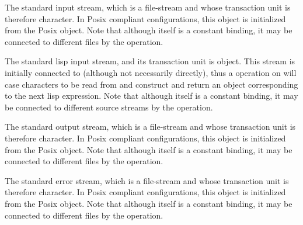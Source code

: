 \begin{optDefinition}

\remarks%
The standard input stream, which is a file-stream and whose transaction unit is
therefore character. In Posix compliant configurations, this object is
initialized from the Posix  object. Note that although
 itself is a constant binding, it may be connected to
different files by the  operation.

\remarks%
The standard lisp input stream, and its transaction unit is object. This stream
is initially connected to  (although not necessarily
directly), thus a  operation on  will case
characters to be read from  and construct and return an
object corresponding to the next lisp expression. Note that although
 itself is a constant binding, it may be connected to
different source streams by the  operation.

\remarks%
The standard output stream, which is a file-stream and whose transaction unit is
therefore character. In Posix compliant configurations, this object is
initialized from the Posix  object. Note that although
 itself is a constant binding, it may be connected to
different files by the  operation.

\remarks%
The standard error stream, which is a file-stream and whose transaction unit is
therefore character. In Posix compliant configurations, this object is
initialized from the Posix  object. Note that although
 itself is a constant binding, it may be connected to
different files by the  operation.


\end{optDefinition}
